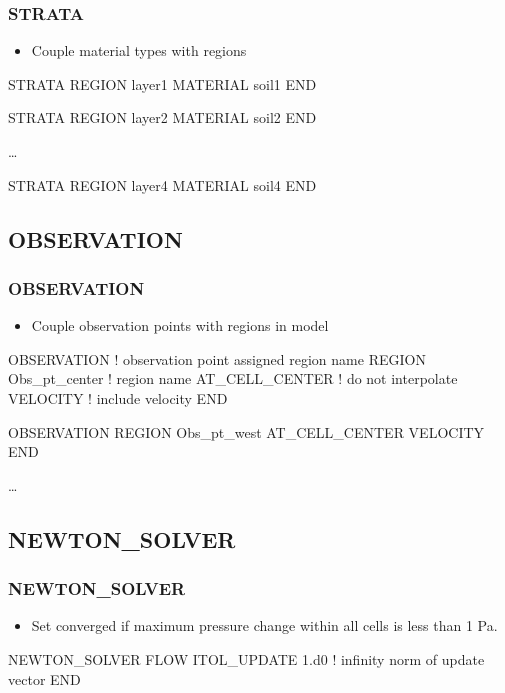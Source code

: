 \documentclass{beamer}
\newcommand\bluecomment[1]{{{\color{blue} #1}}}
\begin{document}
\begin{frame}[fragile]\frametitle{STRATA}

\begin{itemize}
\item Couple material types with regions
\end{itemize}

\begin{semiverbatim}
STRATA
  REGION layer1
  MATERIAL soil1
END

STRATA
  REGION layer2
  MATERIAL soil2
END

\ldots

STRATA
  REGION layer4
  MATERIAL soil4
END
\end{semiverbatim}

\end{frame}


\subsection{OBSERVATION}

\begin{frame}[fragile]\frametitle{OBSERVATION}

\begin{itemize}
\item Couple observation points with regions in model
\end{itemize}

\begin{semiverbatim}
OBSERVATION  \bluecomment{! observation point assigned region name}
  REGION Obs_pt_center  \bluecomment{! region name}
  AT_CELL_CENTER        \bluecomment{! do not interpolate}
  VELOCITY              \bluecomment{! include velocity}
END

OBSERVATION
  REGION Obs_pt_west
  AT_CELL_CENTER
  VELOCITY
END

\dots
\end{semiverbatim}

\end{frame}

\subsection{NEWTON\_SOLVER}

\begin{frame}[fragile]\frametitle{NEWTON\_SOLVER}

\begin{itemize}
  \item Set converged if maximum pressure change within all cells is less than 1 Pa.
\end{itemize}

\begin{semiverbatim}

NEWTON_SOLVER FLOW
ITOL_UPDATE 1.d0   \bluecomment{! infinity norm of update vector}
END
\end{semiverbatim}

\end{frame}
\end{document}
